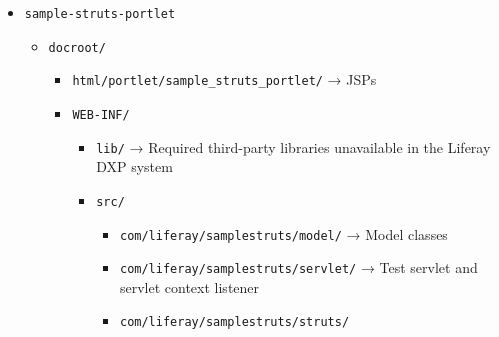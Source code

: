 \begin{itemize}
\tightlist
\item
  \texttt{sample-struts-portlet}

  \begin{itemize}
  \tightlist
  \item
    \texttt{docroot/}

    \begin{itemize}
    \tightlist
    \item
      \texttt{html/portlet/sample\_struts\_portlet/} → JSPs
    \item
      \texttt{WEB-INF/}

      \begin{itemize}
      \tightlist
      \item
        \texttt{lib/} → Required third-party libraries unavailable in
        the Liferay DXP system
      \item
        \texttt{src/}

        \begin{itemize}
        \tightlist
        \item
          \texttt{com/liferay/samplestruts/model/} → Model classes
        \item
          \texttt{com/liferay/samplestruts/servlet/} → Test servlet and
          servlet context listener
        \item
          \texttt{com/liferay/samplestruts/struts/}


\end{itemize}
\end{itemize}
\end{itemize}
\end{itemize}
\end{itemize}

